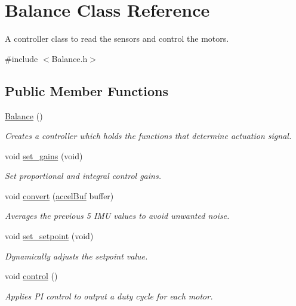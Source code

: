 \hypertarget{classBalance}{}\section{Balance Class Reference}
\label{classBalance}


A controller class to read the sensors and control the motors.  




{\ttfamily \#include $<$Balance.\+h$>$}

\subsection*{Public Member Functions}
\begin{DoxyCompactItemize}
\item 
\hyperlink{classBalance_aa38ff4830ce31f669b4e6fe9c530ebc4}{Balance} ()
\begin{DoxyCompactList}\small\item\em Creates a controller which holds the functions that determine actuation signal. \end{DoxyCompactList}\item 
void \hyperlink{classBalance_aa89fe806776052b38b9ae5e49577f1f3}{set\+\_\+gains} (void)
\begin{DoxyCompactList}\small\item\em Set proportional and integral control gains. \end{DoxyCompactList}\item 
void \hyperlink{classBalance_a9ffdc7dda670129bb61697449f2fd846}{convert} (\hyperlink{structaccelBuf}{accel\+Buf} buffer)
\begin{DoxyCompactList}\small\item\em Averages the previous 5 I\+MU values to avoid unwanted noise. \end{DoxyCompactList}\item 
void \hyperlink{classBalance_a6ad17cb4f844490c1d127a7006457f41}{set\+\_\+setpoint} (void)
\begin{DoxyCompactList}\small\item\em Dynamically adjusts the setpoint value. \end{DoxyCompactList}\item 
void \hyperlink{classBalance_abd8d68db5c2b4ea7c3db8bd565589051}{control} ()
\begin{DoxyCompactList}\small\item\em Applies PI control to output a duty cycle for each motor. \end{DoxyCompactList}\end{DoxyCompactItemize}
